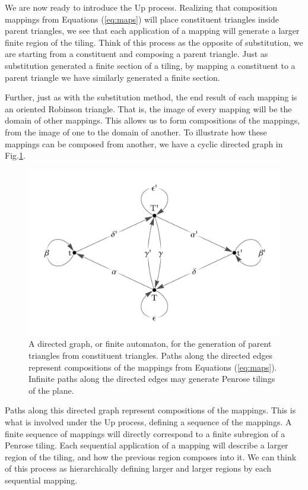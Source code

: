 \documentclass[
  oneside,
  11pt, a4paper,
  footinclude=true,
  headinclude=true,
  cleardoublepage=empty
]{scrbook}
\begin{document}
We are now ready to introduce the Up process. Realizing that composition mappings from Equations (\ref{eq:maps}) will place constituent triangles inside parent triangles, we see that each application of a mapping will generate a larger finite region of the tiling. Think of this process as the opposite of substitution, we are starting from a constituent and composing a  parent triangle. Just as substitution generated a finite section of a tiling, by mapping a constituent to a parent triangle we have similarly generated a finite section.

Further, just as with the substitution method, the end result of each mapping is an oriented Robinson triangle. That is, the image of every mapping will be the domain of other mappings. This allows us to form compositions of the mappings, from the image of one to the domain of another. To illustrate how these mappings can be composed from another, we have a cyclic directed graph in Fig.\ref{fig:UpDownGraph}.

\begin{figure}[H]
\centering
\includegraphics[width=\textwidth]{UpDownGraph}
\caption[Directed Graph of Composition Mappings]{A directed graph, or finite automaton, for the generation of parent triangles from constituent triangles. Paths along the directed edges represent compositions of the mappings from Equations (\ref{eq:maps}). Infinite paths along the directed edges may generate Penrose tilings of the plane.}
\label{fig:UpDownGraph}
\end{figure}

Paths along this directed graph represent compositions of the mappings. This is what is involved under the Up process, defining a sequence of the mappings. A finite sequence of mappings will directly correspond to a finite subregion of a Penrose tiling. Each sequential application of a mapping will describe a larger region of the tiling, and how the previous region composes into it. We can think of this process as hierarchically defining larger and larger regions by each sequential mapping.
\end{document}
